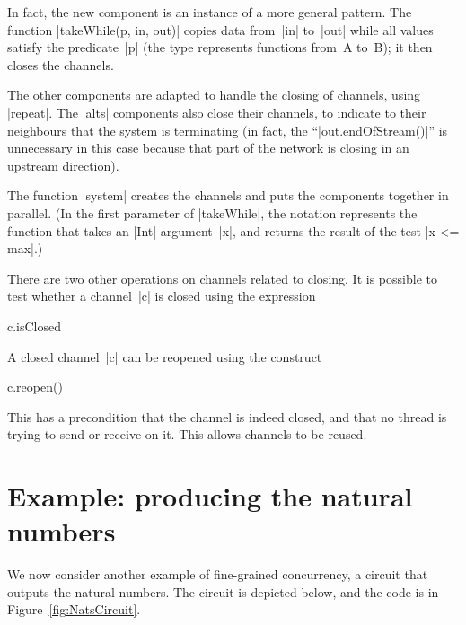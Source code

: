 
In fact, the new component is an instance of a more general pattern.  The
function |takeWhile(p, in, out)| copies data from~|in| to~|out| while all
values satisfy the predicate~|p| (the type \protect{}
  represents functions from~{\scalashape A} to~{\scalashape B}); it then
closes the channels.  

The other components are adapted to handle the closing of channels, using
|repeat|.  The |alts| components also close their channels, to indicate to
their neighbours that the system is terminating (in fact, the
``|out.endOfStream()|'' is unnecessary in this case because that part of the
network is closing in an upstream direction). 

The function |system| creates the channels and puts the components together in
parallel.  (In the first parameter of |takeWhile|, the notation  represents the function that takes an |Int| argument~|x|,
and returns the result of the test |x <= max|.)

\medskip

There are two other operations on channels related to closing. 
It is possible to test whether a channel~|c| is closed using the expression
%
\begin{scala}
  c.isClosed
\end{scala}
%
A closed channel~|c| can be reopened using the construct
\begin{scala}
  c.reopen()
\end{scala}
%
This has a precondition that the channel is indeed closed, and that no thread
is trying to send or receive on it.  This allows channels to be reused.



\section{Example: producing the natural numbers}

We now consider another example of fine-grained concurrency, a circuit that
outputs the natural numbers.  The circuit is depicted below, and the code is
in Figure~\ref{fig:NatsCircuit}. 

\begin{center}
\end{center}

